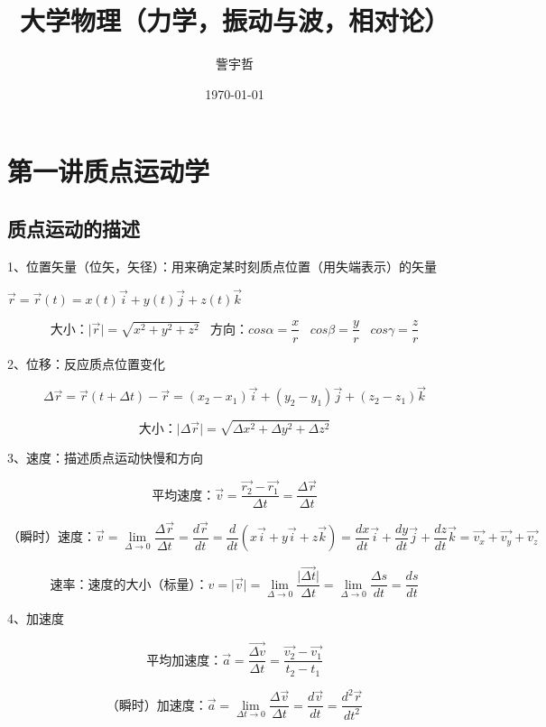 \documentclass[UTF8]{article}
\begin{document}
\title{大学物理（力学，振动与波，相对论）}
\author{訾宇哲}
\date{\today}
\maketitle
\newpage
\tableofcontents
\newpage
\section{第一讲\;\;质点运动学}
\subsection{质点运动的描述}

    1、位置矢量（位矢，矢径）：用来确定某时刻质点位置（用失端表示）的矢量

    \;\;$\vec{r} = \vec{r}(t) = x(t)\vec{i}+y(t)\vec{j}+z(t)\vec{k}$

    \;\;\[\mbox{大小：}\lvert\vec{r}\rvert = \sqrt{x^2+y^2+z^2}\;\;\;\mbox{方向：}cos\alpha = \frac{x}{r}\;\;\;cos\beta = \frac{y}{r}\;\;\;cos\gamma = \frac{z}{r}\]

    2、位移：反应质点位置变化

    \[\Delta \vec{r} = \vec{r}(t + \Delta t) - \vec{r} = (x_2 - x_1)\vec{i} + (y_2-y_1)\vec{j} + (z_2 - z_1)\vec{k}\]

    \[\mbox{大小：}\lvert\Delta\vec{r}\rvert = \sqrt{\Delta x^2 + \Delta y^2 + \Delta z^2}\]

    3、速度：描述质点运动快慢和方向

    \[\mbox{平均速度：}\vec{v} = \frac{\vec{r_2} - \vec{r_1}}{\Delta t}  = \frac{\Delta \vec{r}}{\Delta t}\]

    \[\mbox{（瞬时）速度：}\vec{v} = \lim_{\Delta \rightarrow 0}\frac{\Delta \vec{r}}{\Delta t} = \frac{d\vec{r}}{dt} = \frac{d}{dt}(x\vec{i}+y\vec{i}+z\vec{k}) = \frac{dx}{dt}\vec{i}+\frac{dy}{dt}\vec{j}+\frac{dz}{dt}\vec{k} = \vec{v_x}+\vec{v_y}+\vec{v_z}\]

    \[\mbox{速率：速度的大小（标量）：}v = \lvert\vec{v}\rvert = \lim_{\Delta \rightarrow 0}\frac{\lvert\vec{\Delta t}\rvert}{\Delta t} = \lim_{\Delta \rightarrow 0}\frac{\Delta s}{dt} = \frac{ds}{dt}\]

    4、加速度

    \[\mbox{平均加速度：}\vec{a} = \frac{\vec{\Delta v}}{\Delta t} = \frac{\vec{v_2} - \vec{v_1}}{t_2 - t_1}\]

    \[\mbox{（瞬时）加速度：}\vec{a} = \lim_{\Delta t \rightarrow 0}\frac{\Delta \vec{v}}{\Delta t} = \frac{d\vec{v}}{dt} = \frac{d^2\vec{r}}{dt^2}\]
\end{document}
